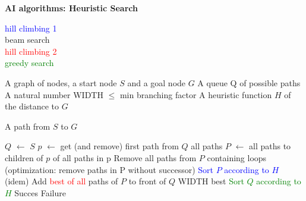\documentclass[11pt] {article}
\newcommand{\algorithmicinput}{\textbf{Input:}}
\newcommand{\algorithmicoutput}{\textbf{Output:}}
\newcommand{\INPUT}{\item[\algorithmicinput]}
\newcommand{\OUTPUT}{\item[\algorithmicoutput]}
\newcommand{\algorithmicalgo}{\textbf{Algorithm:}}
\newcommand{\ALGO}{\item[\algorithmicalgo]}
\begin{document}
\pagestyle{empty}


\begin{center}
\LARGE
\textbf{AI algorithms: Heuristic Search}\\
\end{center}
\vspace{1cm}

\noindent \textcolor{blue}{hill climbing 1}\\
\textcolor[rgb]{1,0,1}{beam search}\\
\textcolor{red}{hill climbing 2}\\
\textcolor{green}{greedy search}\\

\begin{algorithmic}
\INPUT
\STATE A graph of nodes, a start node $S$ and a goal node $G$
\STATE A queue Q of possible paths
\STATE \textcolor[rgb]{1,0,1}{A natural number WIDTH $\leq$ min branching factor}
\STATE A heuristic function $H$ of the distance to $G$

\OUTPUT 
\STATE A path from $S$ to $G$
\end{algorithmic}

\begin{algorithmic}
\ALGO
\STATE $Q$ $\leftarrow$ $S$
\STATE $p$ $\leftarrow$ get (and remove) first path from $Q$
\STATE \hspace{3.73cm} \textcolor[rgb]{1,0,1}{all paths}
\STATE $P$ $\leftarrow$ all paths to children of $p$
\STATE \hspace{4.75cm} \textcolor[rgb]{1,0,1}{of all paths in p}
\STATE Remove all paths from $P$ containing loops
\STATE \textcolor[rgb]{1,0,1}{(optimization: remove paths in P without successor)}
\STATE \textcolor{blue}{Sort $P$ according to $H$} \textcolor[rgb]{1,0,1}{(idem)}
\STATE Add \textcolor{red}{best of all} paths of $P$ to front of $Q$
\STATE \hspace{0.7cm} \textcolor[rgb]{1,0,1}{WIDTH best}
\STATE \textcolor{green}{Sort $Q$ according to $H$}
\ENDWHILE
{}
\STATE Succes
\ELSE
\STATE Failure
\ENDIF
\end{algorithmic}
\end{document}
